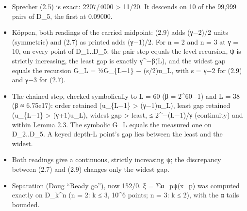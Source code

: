 \begin{enumerate}
\begin{itemize}
\item Sprecher (2.5) is exact: 2207/4000 > 11/20. It descends on 10 of the 99,999 pairs of D\_\allowbreak{}5, the first at 0.09000.
\item Köppen, both readings of the carried midpoint: (2.9) adds (γ−2)/2 units (symmetric) and (2.7) as printed adds (γ−1)/2. For n = 2 and n = 3 at γ = 10, on every point of D\_\allowbreak{}1..D\_\allowbreak{}5: the pair step equals the level recursion, ψ is strictly increasing, the least gap is exactly γ\textasciicircum{}−β(L), and the widest gap equals the recursion G\_\allowbreak{}L = ½G\_\allowbreak{}\{L−1\} − (s/2)u\_\allowbreak{}L, with s = γ−2 for (2.9) and γ−3 for (2.7).
\item The chained step, checked symbolically to L = 60 (β = 2\textasciicircum{}60−1) and L = 38 (β ≈ 6.75e17): order retained (u\_\allowbreak{}\{L−1\} > (γ−1)u\_\allowbreak{}L), least gap retained (u\_\allowbreak{}\{L−1\} > (γ+1)u\_\allowbreak{}L), widest gap > least, ≤ 2\textasciicircum{}−(L−1)/γ (continuity) and within Lemma 2.3. The symbolic G\_\allowbreak{}L equals the measured one on D\_\allowbreak{}2..D\_\allowbreak{}5. A keyed depth-L point's gap lies between the least and the widest.
\item Both readings give a continuous, strictly increasing ψ; the discrepancy between (2.7) and (2.9) changes only the widest gap.
\item Separation (Doug “Ready go”), now 152/0. ξ = Σα\_\allowbreak{}pψ(x\_\allowbreak{}p) was computed exactly on D\_\allowbreak{}k\textasciicircum{}n (n = 2: k ≤ 3, 10\textasciicircum{}6 points; n = 3: k ≤ 2), with the α tails bounded.


\end{itemize}
\end{enumerate}
